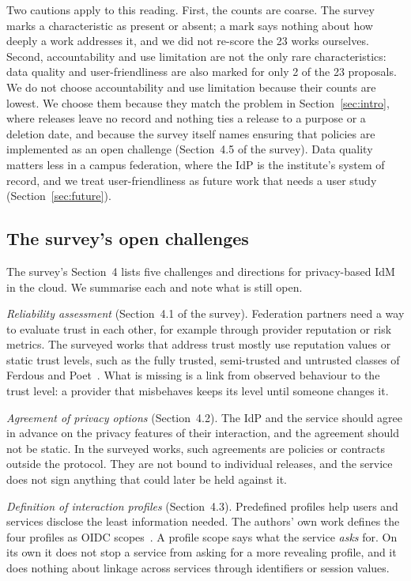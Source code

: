 Two cautions apply to this reading. First, the counts are coarse. The survey marks a characteristic as present or absent; a mark says nothing about how deeply a work addresses it, and we did not re-score the 23 works ourselves. Second, accountability and use limitation are not the only rare characteristics: data quality and user-friendliness are also marked for only 2 of the 23 proposals. We do not choose accountability and use limitation because their counts are lowest. We choose them because they match the problem in Section~\ref{sec:intro}, where releases leave no record and nothing ties a release to a purpose or a deletion date, and because the survey itself names ensuring that policies are implemented as an open challenge (Section~4.5 of the survey). Data quality matters less in a campus federation, where the IdP is the institute's system of record, and we treat user-friendliness as future work that needs a user study (Section~\ref{sec:future}).

\subsection{The survey's open challenges}
The survey's Section~4 lists five challenges and directions for privacy-based IdM in the cloud. We summarise each and note what is still open.

\emph{Reliability assessment} (Section~4.1 of the survey). Federation partners need a way to evaluate trust in each other, for example through provider reputation or risk metrics. The surveyed works that address trust mostly use reputation values or static trust levels, such as the fully trusted, semi-trusted and untrusted classes of Ferdous and Poet~\cite{ferdous2015dynamic}. What is missing is a link from observed behaviour to the trust level: a provider that misbehaves keeps its level until someone changes it.

\emph{Agreement of privacy options} (Section~4.2). The IdP and the service should agree in advance on the privacy features of their interaction, and the agreement should not be static. In the surveyed works, such agreements are policies or contracts outside the protocol. They are not bound to individual releases, and the service does not sign anything that could later be held against it.

\emph{Definition of interaction profiles} (Section~4.3). Predefined profiles help users and services disclose the least information needed. The authors' own work defines the four profiles as OIDC scopes~\cite{werner2015approach}. A profile scope says what the service \emph{asks} for. On its own it does not stop a service from asking for a more revealing profile, and it does nothing about linkage across services through identifiers or session values.

